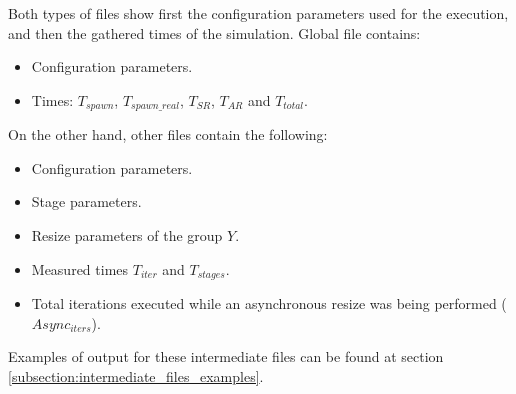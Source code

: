 Both types of files show first the configuration parameters used for the execution, and then the gathered times of the simulation.
Global file  contains: %
\begin{itemize}
    \item Configuration parameters.
    \item Times: $T_{spawn}$, $T_{spawn\_real}$, $T_{SR}$, $T_{AR}$ and $T_{total}$.
\end{itemize}

On the other hand, other files contain the following:
\begin{itemize}
    \item Configuration parameters.
    \item Stage parameters.
    \item Resize parameters of the group $Y$.
    \item Measured times $T_{iter}$ and $T_{stages}$.
    \item Total iterations executed while an asynchronous resize was being performed ($Async_{iters}$).
\end{itemize}

Examples of output for these intermediate files can be found at section \ref{subsection:intermediate_files_examples}.